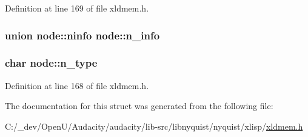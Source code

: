 Definition at line 169 of file xldmem.\+h.

\subsubsection[{\texorpdfstring{n\+\_\+info}{n_info}}]{\setlength{\rightskip}{0pt plus 5cm}union {\bf node\+::ninfo}  node\+::n\+\_\+info}\hypertarget{structnode_a9050597940b4b0e6b42b704d5b4f3bab}{}\label{structnode_a9050597940b4b0e6b42b704d5b4f3bab}
\subsubsection[{\texorpdfstring{n\+\_\+type}{n_type}}]{\setlength{\rightskip}{0pt plus 5cm}char node\+::n\+\_\+type}\hypertarget{structnode_a9a20fdd75eea7d876b803d1dfb92d615}{}\label{structnode_a9a20fdd75eea7d876b803d1dfb92d615}


Definition at line 168 of file xldmem.\+h.



The documentation for this struct was generated from the following file\+:\begin{DoxyCompactItemize}
\item 
C\+:/\+\_\+dev/\+Open\+U/\+Audacity/audacity/lib-\/src/libnyquist/nyquist/xlisp/\hyperlink{xldmem_8h}{xldmem.\+h}\end{DoxyCompactItemize}
